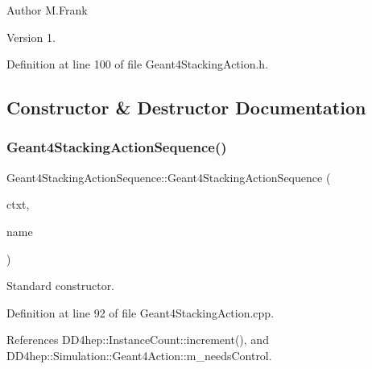 \begin{DoxyAuthor}{Author}
M.\+Frank 
\end{DoxyAuthor}
\begin{DoxyVersion}{Version}
1. 
\end{DoxyVersion}


Definition at line 100 of file Geant4\+Stacking\+Action.\+h.



\subsection{Constructor \& Destructor Documentation}
\hypertarget{class_d_d4hep_1_1_simulation_1_1_geant4_stacking_action_sequence_a31b87eca5a3b72b827bc837bd99ed58b}{}\label{class_d_d4hep_1_1_simulation_1_1_geant4_stacking_action_sequence_a31b87eca5a3b72b827bc837bd99ed58b} 
\subsubsection{\texorpdfstring{Geant4\+Stacking\+Action\+Sequence()}{Geant4StackingActionSequence()}}
{\footnotesize\ttfamily Geant4\+Stacking\+Action\+Sequence\+::\+Geant4\+Stacking\+Action\+Sequence (\begin{DoxyParamCaption}\item[{\hyperlink{class_d_d4hep_1_1_simulation_1_1_geant4_context}{Geant4\+Context} $\ast$}]{ctxt,  }\item[{const std\+::string \&}]{name }\end{DoxyParamCaption})}



Standard constructor. 



Definition at line 92 of file Geant4\+Stacking\+Action.\+cpp.



References D\+D4hep\+::\+Instance\+Count\+::increment(), and D\+D4hep\+::\+Simulation\+::\+Geant4\+Action\+::m\+\_\+needs\+Control.

\hypertarget{class_d_d4hep_1_1_simulation_1_1_geant4_stacking_action_sequence_af4cadf550f682910d7eee326802859d8}{}\label{class_d_d4hep_1_1_simulation_1_1_geant4_stacking_action_sequence_af4cadf550f682910d7eee326802859d8} 
